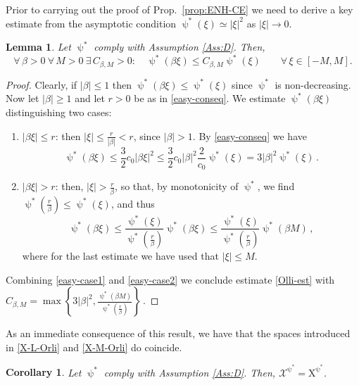 \documentclass[11pt,reqno]{amsart}
\numberwithin{equation}{section}
\newtheorem{corollary}[theorem]{Corollary}
\newtheorem{lemma}[theorem]{Lemma}
\theoremstyle{definition}
\newcommand{\rmX}{\mathrm{X}}
\newcommand{\RCR}{\color{magenta}}
\numberwithin{equation}{section}
\begin{document}
\RCR Prior to carrying out the proof of Prop.\ \ref{prop:ENH-CE} we need to derive a key estimate  from
the asymptotic condition
 $\uppsi^*(\xi) \simeq |\xi|^2 
 $ as $|\xi| \to 0$.
\begin{lemma}
Let $\uppsi^*$ comply with Assumption \ref{Ass:D}.  Then,
\begin{equation}
\label{Olli-est}
\forall\, \beta>0 \ \forall\, M>0  \ \exists\, C_{\beta,M}>0: \quad \uppsi^*(\beta\xi)\leq C_{\beta,M} \uppsi^*(\xi)\qquad\forall\, \xi \in [{-}M,M].
\end{equation}
\end{lemma}
\begin{proof}
Clearly,
if $|\beta|\leq 1$ then $\uppsi^*(\beta \xi) \leq \uppsi^*(\xi)$ since $\uppsi^* $ is non-decreasing. Now let $|\beta | \geq 1$ and let $r>0$
be as in  \eqref{easy-conseq}.
We  estimate $\uppsi^*(\beta \xi)$ distinguishing two cases:
\begin{enumerate}
\item $|\beta \xi| \leq r$: then $|\xi| \leq \tfrac{r}{|\beta|} <r$, since $|\beta|>1$. By  \eqref{easy-conseq}  we have
\begin{equation}
\label{easy-case1}
\uppsi^*(\beta \xi) \leq  \frac32 c_0 |\beta\xi|^2  \leq  \frac32 c_0 |\beta|^2  \frac{2}{c_0} \uppsi^*(\xi) = 3  |\beta|^2 \uppsi^*(\xi) \,.
\end{equation}
\item $|\beta \xi| > r$: then, $|\xi|> \frac r\beta$, so that, by monotonicity of $\uppsi^*$, we find $\uppsi^*(\tfrac r{\beta}) 
\leq \uppsi^*(\xi)$, and thus
\begin{equation}
\label{easy-case2}
\uppsi^*(\beta \xi) \leq  \frac{\uppsi^*(\xi)}{\uppsi^*(\tfrac r{\beta}) }\uppsi^*(\beta \xi) \leq \frac{\uppsi^*(\xi)}{\uppsi^*(\tfrac r{\beta}) }\uppsi^*(\beta M)
\,,
\end{equation}
where for the last estimate we have used that $|\xi| \leq M$.
\end{enumerate}
 Combining \eqref{easy-case1} and \eqref{easy-case2} we conclude estimate \eqref{Olli-est}
with
 $
C_{\beta,M}= \max\left\{ 3  |\beta|^2, \frac{\uppsi^*(\beta M)}{\uppsi^*(\tfrac r{\beta}) }\right\}\,.
$
\end{proof}
As an immediate consequence of this result, we have that the spaces introduced in \eqref{X-L-Orli} and \eqref{X-M-Orli}  do coincide.
\begin{corollary}
\label{cor:identical-spaces}
Let $\uppsi^*$ comply with Assumption \ref{Ass:D}.
Then,  $\mathcal{X}^{\uppsi^*} =  \rmX^{\uppsi^*}$.
\end{corollary}
\end{document}

